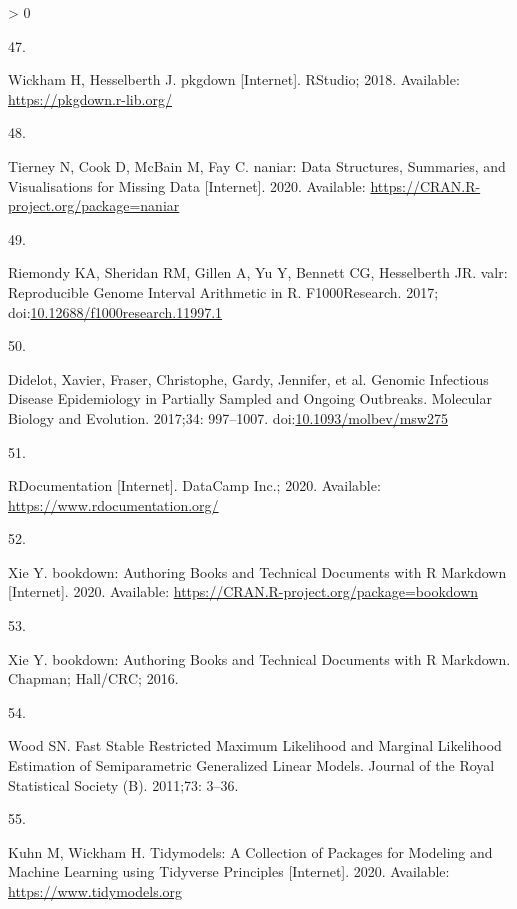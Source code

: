 \documentclass[10pt,letterpaper]{article}
\newlength{\csllabelwidth}
\newlength{\cslhangindent}
\newenvironment{CSLReferences}[3] %
 {%
  \setlength{\parindent}{0pt}
  \ifodd #1 \everypar{\setlength{\hangindent}{\cslhangindent}}\ignorespaces\fi
  \ifnum #2 > 0
  \setlength{\parskip}{#2\baselineskip}
  \fi
 }%
 {}
\newcommand{\CSLLeftMargin}[1]{\parbox[t]{\csllabelwidth}{#1}}
\newcommand{\CSLRightInline}[1]{\parbox[t]{\linewidth - \csllabelwidth}{#1}}
\begin{document}
\begin{CSLReferences}{0}{0}
\leavevmode\hypertarget{ref-pkgdownweb}{}%
\CSLLeftMargin{47. }
\CSLRightInline{Wickham H, Hesselberth J. {pkgdown} {[}Internet{]}.
RStudio; 2018. Available: \url{https://pkgdown.r-lib.org/}}

\leavevmode\hypertarget{ref-naniar}{}%
\CSLLeftMargin{48. }
\CSLRightInline{Tierney N, Cook D, McBain M, Fay C. {naniar: Data
Structures, Summaries, and Visualisations for Missing Data}
{[}Internet{]}. 2020. Available:
\url{https://CRAN.R-project.org/package=naniar}}

\leavevmode\hypertarget{ref-valr}{}%
\CSLLeftMargin{49. }
\CSLRightInline{Riemondy KA, Sheridan RM, Gillen A, Yu Y, Bennett CG,
Hesselberth JR. {valr: Reproducible Genome Interval Arithmetic in R}.
F1000Research. 2017;
doi:\href{https://doi.org/10.12688/f1000research.11997.1}{10.12688/f1000research.11997.1}}

\leavevmode\hypertarget{ref-TransPhylo}{}%
\CSLLeftMargin{50. }
\CSLRightInline{Didelot, Xavier, Fraser, Christophe, Gardy, Jennifer, et
al. {Genomic Infectious Disease Epidemiology in Partially Sampled and
Ongoing Outbreaks}. Molecular Biology and Evolution. 2017;34: 997--1007.
doi:\href{https://doi.org/10.1093/molbev/msw275}{10.1093/molbev/msw275}}

\leavevmode\hypertarget{ref-rdocumentation}{}%
\CSLLeftMargin{51. }
\CSLRightInline{{RDocumentation} {[}Internet{]}. DataCamp Inc.; 2020.
Available: \url{https://www.rdocumentation.org/}}

\leavevmode\hypertarget{ref-bookdown}{}%
\CSLLeftMargin{52. }
\CSLRightInline{Xie Y. {bookdown: Authoring Books and Technical
Documents with R Markdown} {[}Internet{]}. 2020. Available:
\url{https://CRAN.R-project.org/package=bookdown}}

\leavevmode\hypertarget{ref-xie2016}{}%
\CSLLeftMargin{53. }
\CSLRightInline{Xie Y. {bookdown: Authoring Books and Technical
Documents with R Markdown}. Chapman; Hall/CRC; 2016. }

\leavevmode\hypertarget{ref-mgcv}{}%
\CSLLeftMargin{54. }
\CSLRightInline{Wood SN. {Fast Stable Restricted Maximum Likelihood and
Marginal Likelihood Estimation of Semiparametric Generalized Linear
Models}. Journal of the Royal Statistical Society (B). 2011;73: 3--36. }

\leavevmode\hypertarget{ref-tidymodels}{}%
\CSLLeftMargin{55. }
\CSLRightInline{Kuhn M, Wickham H. {Tidymodels: A Collection of Packages
for Modeling and Machine Learning using Tidyverse Principles}
{[}Internet{]}. 2020. Available: \url{https://www.tidymodels.org}}


\end{CSLReferences}
\end{document}
